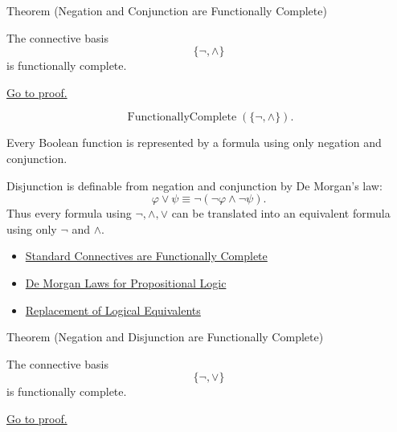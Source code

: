 \begin{theorembox}{Theorem (Negation and Conjunction are Functionally Complete)}
\begin{theorem}
\label{thm:negation-conjunction-functionally-complete-propositional-logic}
The connective basis
\[
\{\neg,\land\}
\]
is functionally complete.

\noindent\hyperref[prf:negation-conjunction-functionally-complete-propositional-logic]{Go to proof.}
\end{theorem}
\end{theorembox}

\begin{remark*}
\[
\operatorname{FunctionallyComplete}(\{\neg,\land\}).
\]
\end{remark*}



\begin{remark*}[Interpretation]
Every Boolean function is represented by a formula using only negation and
conjunction.

Disjunction is definable from negation and conjunction by De Morgan's law:
\[
\varphi\lor\psi\equiv\neg(\neg\varphi\land\neg\psi).
\]
Thus every formula using \(\neg,\land,\lor\) can be translated into an equivalent
formula using only \(\neg\) and \(\land\).
\end{remark*}

\begin{dependencies}
\begin{itemize}
  \item \hyperref[thm:standard-connectives-functionally-complete-propositional-logic]{Standard Connectives are Functionally Complete}
  \item \hyperref[thm:de-morgan-laws-propositional-logic]{De Morgan Laws for Propositional Logic}
  \item \hyperref[thm:replacement-of-logical-equivalents-propositional-logic]{Replacement of Logical Equivalents}
\end{itemize}
\end{dependencies}

\begin{theorembox}{Theorem (Negation and Disjunction are Functionally Complete)}
\begin{theorem}
\label{thm:negation-disjunction-functionally-complete-propositional-logic}
The connective basis
\[
\{\neg,\lor\}
\]
is functionally complete.

\noindent\hyperref[prf:negation-disjunction-functionally-complete-propositional-logic]{Go to proof.}
\end{theorem}
\end{theorembox}

